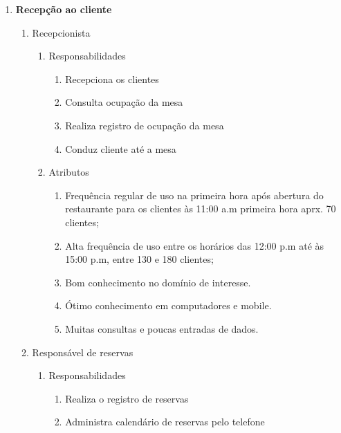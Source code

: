 \begin{enumerate}


  \item \textbf{Recepção ao cliente}

    \begin{enumerate}

      \item Recepcionista

      \begin{enumerate}
        \item Responsabilidades

          \begin{enumerate}

            \item Recepciona os clientes
            \item Consulta ocupação da mesa
            \item Realiza registro de ocupação da mesa
            \item Conduz cliente até a mesa
          \end{enumerate}

        \item Atributos

          \begin{enumerate}
            \item Frequência regular de uso na primeira hora após abertura do restaurante para os clientes às 11:00 a.m primeira hora aprx. 70 clientes;
            \item Alta frequência de uso entre os horários  das 12:00 p.m até às 15:00 p.m, entre 130 e 180  clientes;
            \item Bom conhecimento no domínio de interesse.
            \item Ótimo conhecimento em computadores e mobile.
            \item Muitas consultas e poucas entradas de dados.
          \end{enumerate}
      \end{enumerate}

      \item Responsável de reservas

      \begin{enumerate}
        \item Responsabilidades

          \begin{enumerate}
            \item Realiza o registro de reservas
            \item Administra calendário de reservas pelo telefone
          \end{enumerate}


\end{enumerate}
\end{enumerate}
\end{enumerate}
